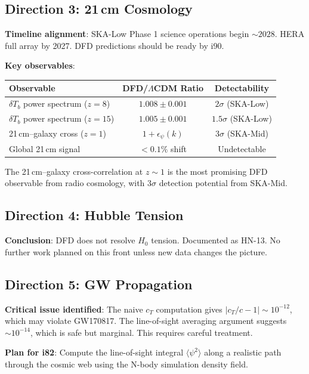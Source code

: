 \documentclass[11pt,a4paper]{article}
\begin{document}
\subsection{Direction 3: 21\,cm Cosmology}

\textbf{Timeline alignment}: SKA-Low Phase 1 science operations begin $\sim 2028$. HERA full array by 2027. DFD predictions should be ready by i90.

\textbf{Key observables}:
\begin{center}
\begin{tabular}{lcc}
\toprule
\textbf{Observable} & \textbf{DFD/$\Lambda$CDM Ratio} & \textbf{Detectability} \\
\midrule
$\delta T_b$ power spectrum ($z = 8$) & $1.008 \pm 0.001$ & $2\sigma$ (SKA-Low) \\
$\delta T_b$ power spectrum ($z = 15$) & $1.005 \pm 0.001$ & $1.5\sigma$ (SKA-Low) \\
21\,cm--galaxy cross ($z = 1$) & $1 + \epsilon_\psi(k)$ & $3\sigma$ (SKA-Mid) \\
Global 21\,cm signal & $< 0.1\%$ shift & Undetectable \\
\bottomrule
\end{tabular}
\end{center}

The 21\,cm--galaxy cross-correlation at $z \sim 1$ is the most promising DFD observable from radio cosmology, with $3\sigma$ detection potential from SKA-Mid.

\subsection{Direction 4: Hubble Tension}

\textbf{Conclusion}: DFD does not resolve $H_0$ tension. Documented as HN-13. No further work planned on this front unless new data changes the picture.

\subsection{Direction 5: GW Propagation}

\textbf{Critical issue identified}: The naive $c_T$ computation gives $|c_T/c - 1| \sim 10^{-12}$, which may violate GW170817. The line-of-sight averaging argument suggests $\sim 10^{-14}$, which is safe but marginal. This requires careful treatment.

\textbf{Plan for i82}: Compute the line-of-sight integral $\langle \psi^2 \rangle$ along a realistic path through the cosmic web using the N-body simulation density field.
\end{document}
